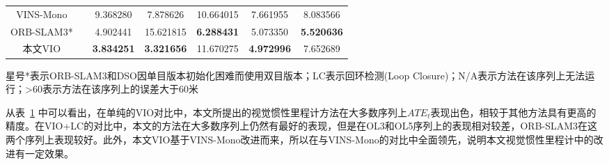\begin{table}
\begin{tabular}{c|c|ccccc}
VINS-Mono       &                         & 9.368280                                 & 7.878626                                 & 10.664015                                & 7.661955                                 & 8.083566                                 \\
ORB-SLAM3*       &                         & 4.902441                                 & 15.621815                                & \cellcolor[HTML]{FA7F6F}\textbf{6.288431}                                 & 5.073350                                 & \cellcolor[HTML]{FA7F6F}\textbf{5.520636}                                 \\
本文VIO            &                         & \cellcolor[HTML]{FA7F6F}\textbf{3.834251}                                 & \cellcolor[HTML]{FA7F6F}\textbf{3.321656}                                 & 11.670275                                & \cellcolor[HTML]{FA7F6F}\textbf{4.972996}                                 & 7.652689                                 \\ \bottomrule
\end{tabular}
\label{tab:vio_ate}
\begin{tablenotes}
  \footnotesize
  \item 星号*表示ORB-SLAM3和DSO因单目版本初始化困难而使用双目版本；LC表示回环检测(Loop Closure)；N/A表示方法在该序列上无法运行；\textgreater{}60表示方法在该序列上的误差大于60米
\end{tablenotes}
\end{table}

从表~\ref{tab:vio_ate} 中可以看出，在单纯的VIO对比中，本文所提出的视觉惯性里程计方法在大多数序列上$ATE_t$表现出色，相较于其他方法具有更高的精度。在VIO+LC的对比中，本文的方法在大多数序列上仍然有最好的表现，但是在OL3和OL5序列上的表现相对较差，ORB-SLAM3在这两个序列上表现较好。此外，本文VIO基于VINS-Mono改进而来，所以在与VINS-Mono的对比中全面领先，说明本文视觉惯性里程计中的改进有一定效果。

